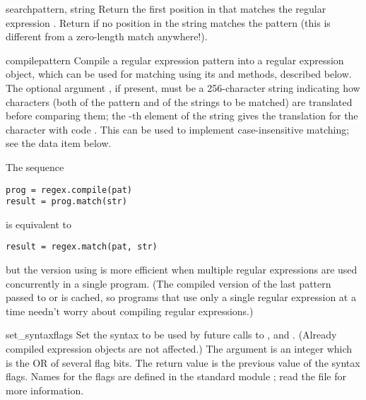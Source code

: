 \begin{funcdesc}{search}{pattern, string}
  Return the first position in  that matches the regular
  expression .  Return  if no position in the string
  matches the pattern (this is different from a zero-length match
  anywhere!).
\end{funcdesc}

\begin{funcdesc}{compile}{pattern}
  Compile a regular expression pattern into a regular expression
  object, which can be used for matching using its  and
   methods, described below.  The optional argument
  , if present, must be a 256-character string
  indicating how characters (both of the pattern and of the strings to
  be matched) are translated before comparing them; the -th
  element of the string gives the translation for the character with
  \ASCII{} code .  This can be used to implement
  case-insensitive matching; see the  data item below.

  The sequence

\begin{verbatim}
prog = regex.compile(pat)
result = prog.match(str)
\end{verbatim}
%
is equivalent to

\begin{verbatim}
result = regex.match(pat, str)
\end{verbatim}

but the version using  is more efficient when multiple
regular expressions are used concurrently in a single program.  (The
compiled version of the last pattern passed to  or
 is cached, so programs that use only a single
regular expression at a time needn't worry about compiling regular
expressions.)
\end{funcdesc}

\begin{funcdesc}{set_syntax}{flags}
  Set the syntax to be used by future calls to ,
   and .  (Already compiled expression
  objects are not affected.)  The argument is an integer which is the
  OR of several flag bits.  The return value is the previous value of
  the syntax flags.  Names for the flags are defined in the standard 
  module ; read the
  file  for more information.
\end{funcdesc}

